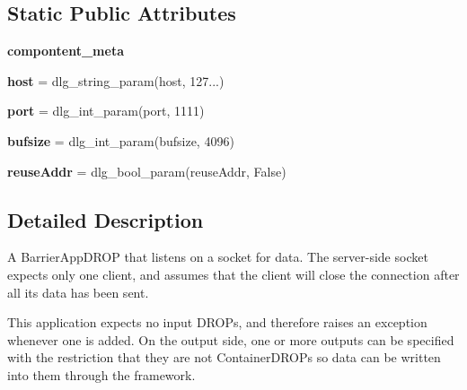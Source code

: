 \subsection*{Static Public Attributes}
\begin{DoxyCompactItemize}
\item 
{\bfseries compontent\+\_\+meta}
\item 
\mbox{\label{classdlg_1_1apps_1_1socket__listener_1_1_socket_listener_app_aaee39e73277620a59dbdd6ccb979eecc}} 
{\bfseries host} = dlg\+\_\+string\+\_\+param(\textquotesingle{}host\textquotesingle{}, \textquotesingle{}127...\textquotesingle{})
\item 
\mbox{\label{classdlg_1_1apps_1_1socket__listener_1_1_socket_listener_app_abf15f46b9937dece468af52e0eb91b84}} 
{\bfseries port} = dlg\+\_\+int\+\_\+param(\textquotesingle{}port\textquotesingle{}, 1111)
\item 
\mbox{\label{classdlg_1_1apps_1_1socket__listener_1_1_socket_listener_app_a85902b816fdc51aa4cd1b4aeac34e743}} 
{\bfseries bufsize} = dlg\+\_\+int\+\_\+param(\textquotesingle{}bufsize\textquotesingle{}, 4096)
\item 
\mbox{\label{classdlg_1_1apps_1_1socket__listener_1_1_socket_listener_app_a5bd4497bc91bb133407572a86fecd7f0}} 
{\bfseries reuse\+Addr} = dlg\+\_\+bool\+\_\+param(\textquotesingle{}reuse\+Addr\textquotesingle{}, False)
\end{DoxyCompactItemize}


\subsection{Detailed Description}
\begin{DoxyVerb}A BarrierAppDROP that listens on a socket for data. The server-side
socket expects only one client, and assumes that the client will close the
connection after all its data has been sent.

This application expects no input DROPs, and therefore raises an
exception whenever one is added. On the output side, one or more outputs
can be specified with the restriction that they are not ContainerDROPs
so data can be written into them through the framework.
\end{DoxyVerb}
 

